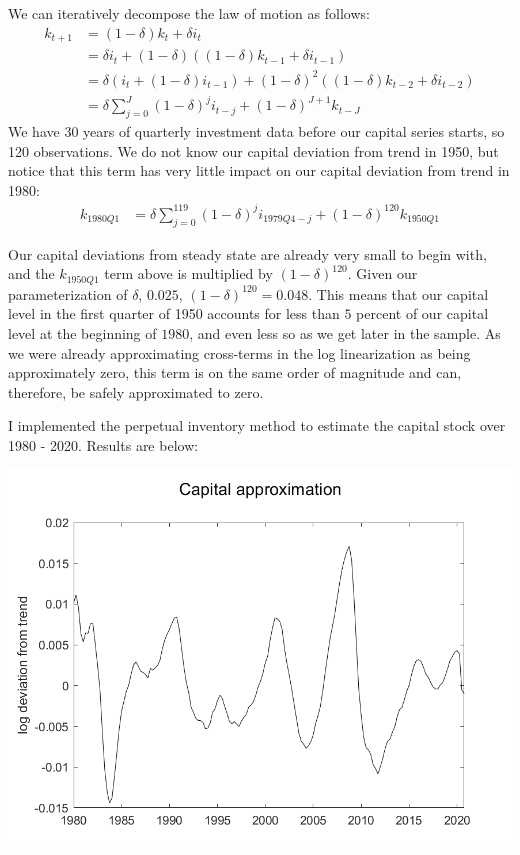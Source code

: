 \documentclass[11pt]{article} %
\begin{document}
We can iteratively decompose the law of motion as follows:
\begin{align*}
k_{t+1} &= (1-\delta)k_t + \delta i_t\\
&= \delta i_t + (1-\delta)((1-\delta)k_{t-1} + \delta i_{t-1})\\
&= \delta (i_t + (1-\delta) i_{t-1}) + (1-\delta)^2((1-\delta)k_{t-2} + \delta i_{t-2})\\
&= \delta \sum_{j=0}^J(1-\delta)^j i_{t-j} +(1-\delta)^{J+1} k_{t-J}
\end{align*}
We have 30 years of quarterly investment data before our capital series starts, so 120 observations. We do not know our capital deviation from trend in 1950, but notice that this term has very little impact on our capital deviation from trend in 1980:
\begin{align*}
k_{1980Q1} &= \delta \sum_{j=0}^{119}(1-\delta)^j i_{1979Q4-j} +(1-\delta)^{120} k_{1950Q1}
\end{align*}

Our capital deviations from steady state are already very small to begin with, and the $k_{1950Q1}$ term above is multiplied by $(1-\delta)^{120}.$ Given our parameterization of $\delta$, $0.025$, $(1-\delta)^{120} = 0.048.$ This means that our capital level in the first quarter of 1950 accounts for less than $5$ percent of our capital level at the beginning of $1980$, and even less so as we get later in the sample. As we were already approximating cross-terms in the log linearization as being approximately zero, this term is on the same order of magnitude and can, therefore, be safely approximated to zero.

I implemented the perpetual inventory method to estimate the capital stock over 1980 - 2020. Results are below:

\includegraphics{detk}
\end{document}

